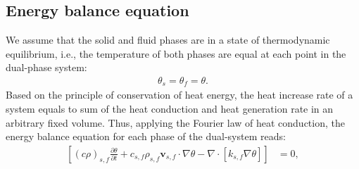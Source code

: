 
\subsection{Energy balance equation} %
We assume that the solid and fluid phases are in a state of thermodynamic equilibrium, i.e., the temperature of both phases are equal at each point in the dual-phase system:
\begin{equation} \label{Eq:thermo_equilibrium}
\begin{aligned}
\theta_s=\theta_f=\theta.
\end{aligned}
\end{equation}
Based on the principle of conservation of heat energy, the heat increase rate of a system equals to sum of the heat conduction and heat generation rate in an arbitrary fixed volume.
Thus, applying the Fourier law of heat conduction, the energy balance equation for each phase of the dual-system reads:
\begin{equation}\label{Eq:energy_balance}
\begin{aligned}
\left[(c\rho)_{s,f}\frac{\partial\theta}{\partial t}+c_{s,f}\rho_{s,f}\mathbf{v}_{s,f}\cdot\nabla \theta - \nabla\cdot\left[{k}_{s,f}\nabla \theta \right] \right] &=0,
\end{aligned}
\end{equation}
